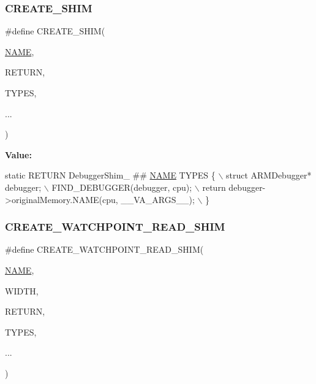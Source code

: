 \subsubsection{\texorpdfstring{C\+R\+E\+A\+T\+E\+\_\+\+S\+H\+IM}{CREATE\_SHIM}}
{\footnotesize\ttfamily \#define C\+R\+E\+A\+T\+E\+\_\+\+S\+H\+IM(\begin{DoxyParamCaption}\item[{}]{\mbox{\hyperlink{inflate_8h_a164ea0159d5f0b5f12a646f25f99eceaa67bc2ced260a8e43805d2480a785d312}{N\+A\+ME}},  }\item[{}]{R\+E\+T\+U\+RN,  }\item[{}]{T\+Y\+P\+ES,  }\item[{}]{... }\end{DoxyParamCaption})}

{\bfseries Value\+:}
\begin{DoxyCode}
\textcolor{keyword}{static} RETURN DebuggerShim\_ ## \mbox{\hyperlink{inflate_8h_a164ea0159d5f0b5f12a646f25f99eceaa67bc2ced260a8e43805d2480a785d312}{NAME}} TYPES \{ \(\backslash\)
        struct ARMDebugger* debugger; \(\backslash\)
        FIND\_DEBUGGER(debugger, cpu); \(\backslash\)
        return debugger->originalMemory.NAME(cpu, \_\_VA\_ARGS\_\_); \(\backslash\)
    \}
\end{DoxyCode}
\mbox{\label{arm_2debugger_2memory-debugger_8c_ad09cc838e97e4312502897565e1ba045}} 
\subsubsection{\texorpdfstring{C\+R\+E\+A\+T\+E\+\_\+\+W\+A\+T\+C\+H\+P\+O\+I\+N\+T\+\_\+\+R\+E\+A\+D\+\_\+\+S\+H\+IM}{CREATE\_WATCHPOINT\_READ\_SHIM}}
{\footnotesize\ttfamily \#define C\+R\+E\+A\+T\+E\+\_\+\+W\+A\+T\+C\+H\+P\+O\+I\+N\+T\+\_\+\+R\+E\+A\+D\+\_\+\+S\+H\+IM(\begin{DoxyParamCaption}\item[{}]{\mbox{\hyperlink{inflate_8h_a164ea0159d5f0b5f12a646f25f99eceaa67bc2ced260a8e43805d2480a785d312}{N\+A\+ME}},  }\item[{}]{W\+I\+D\+TH,  }\item[{}]{R\+E\+T\+U\+RN,  }\item[{}]{T\+Y\+P\+ES,  }\item[{}]{... }\end{DoxyParamCaption})}

